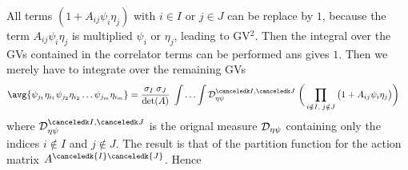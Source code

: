 %
All terms $(1+A_{ij}\psi_{i}\eta_{j})$ with $i\in I$ or $j\in J$ can be replace by $1$, because
the  term $A_{ij} \psi_{i}\eta_{j}$ is multiplied $\psi_{i}$  or $\eta_{j}$, leading to GV$^{2}$. Then the integral  over the GVs contained in the
correlator terms can be performed ans gives $1$. Then we merely have to integrate over the remaining GVs 
%
\begin{align*}
\avg{\psi_{j_{1}}\eta_{i_{1}}\psi_{j_{2}}\eta_{i_{2}}\ldots \psi_{j_{m}}\eta_{i_{m}}}
&=\frac{\sigma_{I}\; \sigma_{J}}{\det(A)}\;\Int \Depx   \;
\bigg(\prod_{i\notin I, \;j\notin J}\big( 1 + A_{ij} \psi_{i} \eta_{j}\big)\bigg) 
\end{align*}
%
where $\Depx$ is the orignal measure ${\cal D}_{\eta \psi}$ containing only  the indices 
$i\notin I$ and $j\notin J$.
The result is that of the partition function for the action matrix $A^{\canceledk{I}\canceledk{J}}$. Hence

